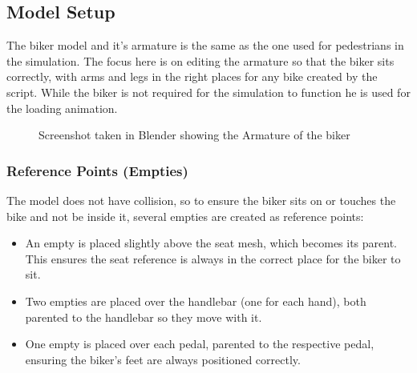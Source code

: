 \documentclass[letterpaper,10pt,english]{jupyterBook}
\begin{document}
\subsection{Model Setup}
\label{\detokenize{Biker:model-setup}}
\sphinxAtStartPar
The biker model and it’s armature is the same as the one used for pedestrians in the simulation. The focus here is on editing the armature so that the biker sits correctly, with arms and legs in the right places for any bike created by the script. While the biker is not required for the simulation to function he is used for the loading animation.

\begin{figure}[htbp]
\centering
\capstart

\noindent{}
\caption{Screenshot taken in Blender showing the Armature of the biker}\label{\detokenize{Biker:id1}}\end{figure}


\subsubsection{Reference Points (Empties)}
\label{\detokenize{Biker:reference-points-empties}}
\sphinxAtStartPar
The model does not have collision, so to ensure the biker sits on or touches the bike and not be inside it, several empties are created as reference points:
\begin{itemize}
\item {} 
\sphinxAtStartPar
{} An empty is placed slightly above the seat mesh, which becomes its parent. This ensures the seat reference is always in the correct place for the biker to sit.

\item {} 
\sphinxAtStartPar
{} Two empties are placed over the handlebar (one for each hand), both parented to the handlebar so they move with it.

\item {} 
\sphinxAtStartPar
{} One empty is placed over each pedal, parented to the respective pedal, ensuring the biker’s feet are always positioned correctly.

\end{itemize}
\end{document}

